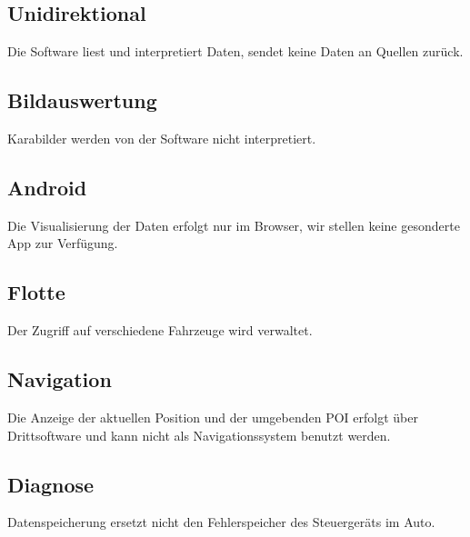 \documentclass[pflichtenheft.tex]{subfiles}
\begin{document}
\subsection{\mknr Unidirektional} Die Software liest und interpretiert Daten, sendet keine Daten an Quellen zurück.

\subsection{\mknr Bildauswertung} Karabilder werden von der Software nicht interpretiert.

\subsection{\mknr Android} Die Visualisierung der Daten erfolgt nur im Browser, wir stellen keine gesonderte App zur Verfügung.

\subsection{\mknr Flotte} Der Zugriff auf verschiedene Fahrzeuge wird verwaltet.

\subsection{\mknr Navigation} Die Anzeige der aktuellen Position und der umgebenden POI erfolgt über Drittsoftware und kann nicht als Navigationssystem benutzt werden.

\subsection{\mknr Diagnose} Datenspeicherung ersetzt nicht den Fehlerspeicher des Steuergeräts im Auto. 
\end{document}
